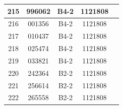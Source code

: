 \documentclass[UTF8,10pt,a4paper,fontset=fandol]{ctexart}
\newcommand{\fieldvalue}[1]{#1}
\begin{document}
\begin{center}
\begin{tabular}{|c|c|c|c|c|}
215 &
\fieldvalue{996062} &
\fieldvalue{B4-2} &
\fieldvalue{1121808} & \\ \hline
216 &
\fieldvalue{001356} &
\fieldvalue{B4-2} &
\fieldvalue{1121808} & \\ \hline
217 &
\fieldvalue{010437} &
\fieldvalue{B4-2} &
\fieldvalue{1121808} & \\ \hline
218 &
\fieldvalue{025474} &
\fieldvalue{B4-2} &
\fieldvalue{1121808} & \\ \hline
219 &
\fieldvalue{033821} &
\fieldvalue{B4-2} &
\fieldvalue{1121808} & \\ \hline
220 &
\fieldvalue{242364} &
\fieldvalue{B2-2} &
\fieldvalue{1121808} & \\ \hline
221 &
\fieldvalue{256614} &
\fieldvalue{B2-2} &
\fieldvalue{1121808} & \\ \hline
222 &
\fieldvalue{265558} &
\fieldvalue{B2-2} &
\fieldvalue{1121808} & \\ \hline

\end{tabular}
\end{center}
\end{document}
